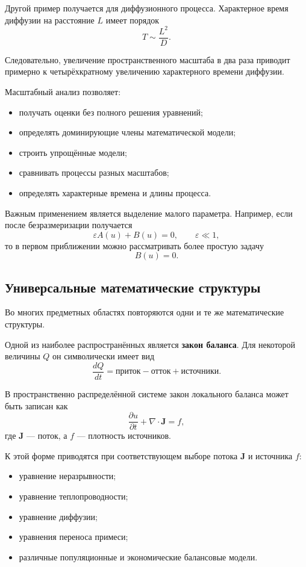 Другой пример получается для диффузионного процесса. Характерное время диффузии на расстояние $L$ имеет порядок
\[
T\sim\frac{L^2}{D}.
\]

Следовательно, увеличение пространственного масштаба в два раза приводит примерно к четырёхкратному увеличению характерного времени диффузии.

Масштабный анализ позволяет:
\begin{itemize}
	\item получать оценки без полного решения уравнений;
	\item определять доминирующие члены математической модели;
	\item строить упрощённые модели;
	\item сравнивать процессы разных масштабов;
	\item определять характерные времена и длины процесса.
\end{itemize}

Важным применением является выделение малого параметра. Например, если после безразмеризации получается
\[
\varepsilon A(u)+B(u)=0,
\qquad
\varepsilon\ll 1,
\]
то в первом приближении можно рассматривать более простую задачу
\[
B(u)=0.
\]

\subsection{Универсальные математические структуры}

Во многих предметных областях повторяются одни и те же математические структуры.

Одной из наиболее распространённых является \textbf{закон баланса}. Для некоторой величины $Q$ он символически имеет вид
\[
\frac{dQ}{dt}
=
\text{приток}
-
\text{отток}
+
\text{источники}.
\]

В пространственно распределённой системе закон локального баланса может быть записан как
\[
\frac{\partial u}{\partial t}
+
\nabla\cdot\mathbf J
=
f,
\]
где $\mathbf J$ --- поток, а $f$ --- плотность источников.

К этой форме приводятся при соответствующем выборе потока $\mathbf J$ и источника $f$:
\begin{itemize}
	\item уравнение неразрывности;
	\item уравнение теплопроводности;
	\item уравнение диффузии;
	\item уравнения переноса примеси;
	\item различные популяционные и экономические балансовые модели.
\end{itemize}

